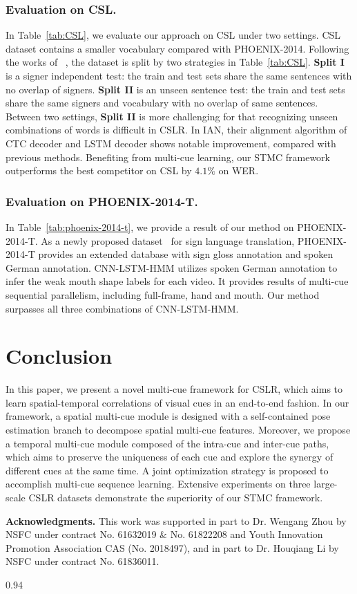 \documentclass[letterpaper]{article} %
\begin{document}
\subsubsection{Evaluation on CSL.} In Table~\ref{tab:CSL}, we evaluate our approach on CSL under two settings. CSL dataset contains a smaller vocabulary compared with PHOENIX-2014. Following the works of ~\cite{han,hlstm}, the dataset is split by two strategies in Table~\ref{tab:CSL}. \textbf{Split I} is a signer independent test: the train and test sets share the same sentences with no overlap of signers. \textbf{Split II} is an unseen sentence test: the train and test sets share the same signers and vocabulary with no overlap of same sentences. Between two settings, \textbf{Split II} is more challenging for that recognizing unseen combinations of words is difficult in CSLR. In IAN, their alignment algorithm of CTC decoder and LSTM decoder shows notable improvement, compared with previous methods. Benefiting from multi-cue learning, our STMC framework outperforms the best competitor on CSL by $4.1\%$ on WER.

\subsubsection{Evaluation on PHOENIX-2014-T.} In Table~\ref{tab:phoenix-2014-t}, we provide a result of our method on PHOENIX-2014-T. As a newly proposed dataset~\cite{phoenix2014t} for sign language translation, PHOENIX-2014-T provides an extended database with sign gloss annotation and spoken German annotation. CNN-LSTM-HMM utilizes spoken German annotation to infer the weak mouth shape labels for each video. It provides results of multi-cue sequential parallelism, including full-frame, hand and mouth. Our method surpasses all three combinations of CNN-LSTM-HMM.

\section{Conclusion}
In this paper, we present a novel multi-cue framework for CSLR, which aims to learn spatial-temporal correlations of visual cues in an end-to-end fashion. In our framework, a spatial multi-cue module is designed with a self-contained pose estimation branch to decompose spatial multi-cue features. Moreover, we propose a temporal multi-cue module composed of the intra-cue and inter-cue paths, which aims to preserve the uniqueness of each cue and explore the synergy of different cues at the same time. A joint optimization strategy is proposed to accomplish multi-cue sequence learning. Extensive experiments on three large-scale CSLR datasets demonstrate the superiority of our STMC framework.

{\bf Acknowledgments.} This work was supported in part to Dr. Wengang Zhou by NSFC under contract No. 61632019 \& No. 61822208 and Youth Innovation Promotion Association CAS (No. 2018497), and in part to Dr. Houqiang Li by NSFC under contract No. 61836011. 

{
\begin{spacing}{0.94}

\footnotesize



    
\end{spacing}
}
\end{document}
